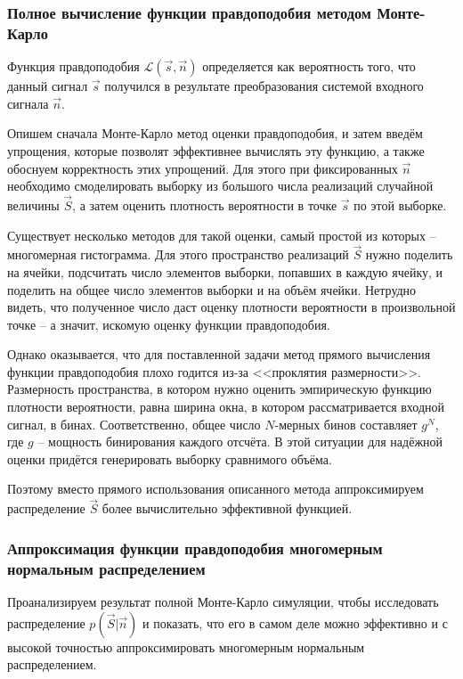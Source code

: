 \subsubsection{Полное вычисление функции правдоподобия методом Монте-Карло}

\label{sec:naive-monte-carlo-likelihood}

Функция правдоподобия $\mathcal{L}(\vec{s}, \vec{n})$ определяется как вероятность того, что данный сигнал $\vec{s}$ получился в результате преобразования системой входного сигнала $\vec{n}$.

Опишем сначала Монте-Карло метод оценки правдоподобия, и затем введём упрощения, которые позволят эффективнее вычислять эту функцию, а также обоснуем корректность этих упрощений. Для этого при фиксированных $\vec{n}$ необходимо смоделировать выборку из большого числа реализаций случайной величины $\vec{S}$, а затем оценить плотность вероятности в точке $\vec{s}$ по этой выборке.

Существует несколько методов для такой оценки, самый простой из которых -- многомерная гистограмма. Для этого пространство реализаций $\vec{S}$ нужно поделить на ячейки, подсчитать число элементов выборки, попавших в каждую ячейку, и поделить на общее число элементов выборки и на объём ячейки. Нетрудно видеть, что полученное число даст оценку плотности вероятности в произвольной точке -- а значит, искомую оценку функции правдоподобия.

Однако оказывается, что для поставленной задачи метод прямого вычисления функции правдоподобия плохо годится из-за <<проклятия размерности>>. Размерность пространства, в котором нужно оценить эмпирическую функцию плотности вероятности, равна ширина окна, в котором рассматривается входной сигнал, в бинах. Соответственно, общее число $N$-мерных бинов составляет $g^{N}$, где $g$ -- мощность бинирования каждого отсчёта. В этой ситуации для надёжной оценки придётся генерировать выборку сравнимого объёма.

Поэтому вместо прямого использования описанного метода аппроксимируем распределение $\vec{S}$ более вычислительно эффективной функцией.

\subsubsection{Аппроксимация функции правдоподобия многомерным нормальным распределением}

\label{sec:likelihood-as-multivar-normal}

Проанализируем результат полной Монте-Карло симуляции, чтобы исследовать распределение $p(\vec{S} | \vec{n})$ и показать, что его в самом деле можно эффективно и с высокой точностью аппроксимировать многомерным нормальным распределением.

